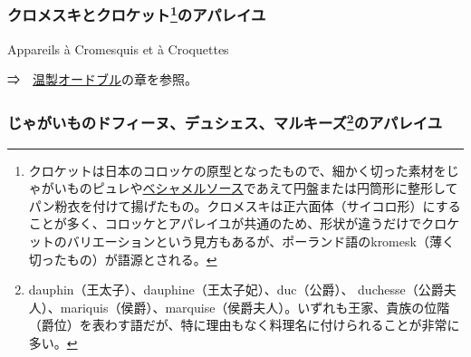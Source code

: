 \begin{recette}

\hypertarget{appareils-a-cromesquis-et-a-croquettes}{%
\subsubsection[クロメスキとクロケットのアパレイユ]{\texorpdfstring{クロメスキとクロケット\footnote{クロケットは日本のコロッケの原型となったもので、細かく切った素材をじゃがいものピュレや\protect\hyperlink{sauce-bechamel}{ベシャメルソース}であえて円盤または円筒形に整形してパン粉衣を付けて揚げたもの。クロメスキは正六面体（サイコロ形）にすることが多く、コロッケとアパレイユが共通のため、形状が違うだけでクロケットのバリエーションという見方もあるが、ポーランド語のkromesk（薄く切ったもの）が語源とされる。}のアパレイユ}{クロメスキとクロケットのアパレイユ}}\label{appareils-a-cromesquis-et-a-croquettes}}

\begin{frsubenv}

Appareils à Cromesquis et à Croquettes

\end{frsubenv}


⇒　\protect\hyperlink{hors-d-oeuvres-chauds}{温製オードブル}の章を参照。

\atoaki{}

\hypertarget{appareils-a-pomme-dauphine-duchesse-marquise}{%
\subsubsection[じゃがいものドフィーヌ、デュシェス、マルキーズのアパレイユ]{\texorpdfstring{じゃがいものドフィーヌ、デュシェス、マルキーズ\footnote{dauphin（王太子）、dauphine（王太子妃）、duc（公爵）、
  duchesse（公爵夫人）、mariquis（侯爵）、marquise（侯爵夫人）。いずれも王家、貴族の位階（爵位）を表わす語だが、特に理由もなく料理名に付けられることが非常に多い。}のアパレイユ}{じゃがいものドフィーヌ、デュシェス、マルキーズのアパレイユ}}\label{appareils-a-pomme-dauphine-duchesse-marquise}}


\end{recette}
